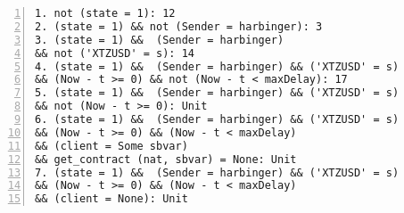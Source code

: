 \begin{lstlisting}[float=tp,captionpos=b,caption={Failwith condition for the entrypoint setXtzUsdPrice\_callback},label={lst:setXtzUsdPrice_callback},numbers=left]
1. not (state = 1): 12
2. (state = 1) && not (Sender = harbinger): 3
3. (state = 1) &&  (Sender = harbinger) 
&& not ('XTZUSD' = s): 14
4. (state = 1) &&  (Sender = harbinger) && ('XTZUSD' = s)
&& (Now - t >= 0) && not (Now - t < maxDelay): 17
5. (state = 1) &&  (Sender = harbinger) && ('XTZUSD' = s)
&& not (Now - t >= 0): Unit
6. (state = 1) &&  (Sender = harbinger) && ('XTZUSD' = s)
&& (Now - t >= 0) && (Now - t < maxDelay) 
&& (client = Some sbvar) 
&& get_contract (nat, sbvar) = None: Unit
7. (state = 1) &&  (Sender = harbinger) && ('XTZUSD' = s)
&& (Now - t >= 0) && (Now - t < maxDelay) 
&& (client = None): Unit
\end{lstlisting}

